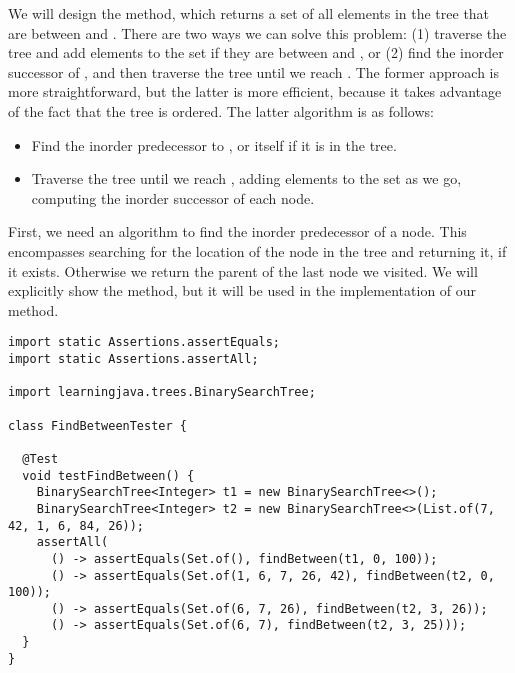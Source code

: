 We will design the  method, which returns a set of all elements in the tree that are between  and . 
There are two ways we can solve this problem: (1) traverse the tree and add elements to the set if they are between  and , or (2) find the inorder successor of , and then traverse the tree until we reach .
The former approach is more straightforward, but the latter is more efficient, because it takes advantage of the fact that the tree is ordered. 
The latter algorithm is as follows:
\begin{itemize}
  \item Find the inorder predecessor to , or  itself if it is in the tree.
  \item Traverse the tree until we reach , adding elements to the set as we go, computing the inorder successor of each node.
\end{itemize}

First, we need an algorithm to find the inorder predecessor of a node. 
This encompasses searching for the location of the node in the tree and returning it, if it exists. Otherwise we return the parent of the last node we visited. We will explicitly show the  method, but it will be used in the implementation of our  method.

\begin{lstlisting}[language=MyJava]
import static Assertions.assertEquals;
import static Assertions.assertAll;

import learningjava.trees.BinarySearchTree;

class FindBetweenTester {

  @Test
  void testFindBetween() {
    BinarySearchTree<Integer> t1 = new BinarySearchTree<>();
    BinarySearchTree<Integer> t2 = new BinarySearchTree<>(List.of(7, 42, 1, 6, 84, 26));
    assertAll(
      () -> assertEquals(Set.of(), findBetween(t1, 0, 100));
      () -> assertEquals(Set.of(1, 6, 7, 26, 42), findBetween(t2, 0, 100));
      () -> assertEquals(Set.of(6, 7, 26), findBetween(t2, 3, 26));
      () -> assertEquals(Set.of(6, 7), findBetween(t2, 3, 25)));
  }
}
\end{lstlisting}

